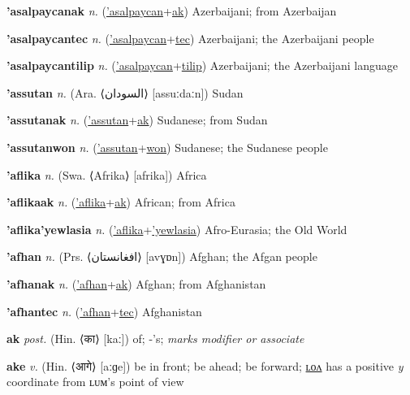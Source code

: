 \textbf{\hypertarget{'asalpaycanak}{'asalpaycanak}} \textit{n.} (\hyperlink{'asalpaycan}{'asalpaycan}+\allowbreak \hyperlink{ak}{ak})
Azerbaijani; from Azerbaijan

\textbf{\hypertarget{'asalpaycantec}{'asalpaycantec}} \textit{n.} (\hyperlink{'asalpaycan}{'asalpaycan}+\allowbreak \hyperlink{tec}{tec})
Azerbaijani; the Azerbaijani people

\textbf{\hypertarget{'asalpaycantilip}{'asalpaycantilip}} \textit{n.} (\hyperlink{'asalpaycan}{'asalpaycan}+\allowbreak \hyperlink{tilip}{tilip})
Azerbaijani; the Azerbaijani language

\textbf{\hypertarget{'assutan}{'assutan}} \textit{n.} (Ara. ⟨{\arabics{}السودان‎}⟩ [assuːdaːn])
Sudan

\textbf{\hypertarget{'assutanak}{'assutanak}} \textit{n.} (\hyperlink{'assutan}{'assutan}+\allowbreak \hyperlink{ak}{ak})
Sudanese; from Sudan

\textbf{\hypertarget{'assutanwon}{'assutanwon}} \textit{n.} (\hyperlink{'assutan}{'assutan}+\allowbreak \hyperlink{won}{won})
Sudanese; the Sudanese people

\textbf{\hypertarget{'aflika}{'aflika}} \textit{n.} (Swa. ⟨Afrika⟩ [afrika])
Africa

\textbf{\hypertarget{'aflikaak}{'aflikaak}} \textit{n.} (\hyperlink{'aflika}{'aflika}+\allowbreak \hyperlink{ak}{ak})
African; from Africa

\textbf{\hypertarget{'aflika'yewlasia}{'aflika'yewlasia}} \textit{n.} (\hyperlink{'aflika}{'aflika}+\allowbreak \hyperlink{'yewlasia}{'yewlasia})
Afro-Eurasia; the Old World

\textbf{\hypertarget{'afhan}{'afhan}} \textit{n.} (Prs. ⟨{\arabics{}افغانستان‬}⟩ [avɣɒn])
Afghan; the Afgan people

\textbf{\hypertarget{'afhanak}{'afhanak}} \textit{n.} (\hyperlink{'afhan}{'afhan}+\allowbreak \hyperlink{ak}{ak})
Afghan; from Afghanistan

\textbf{\hypertarget{'afhantec}{'afhantec}} \textit{n.} (\hyperlink{'afhan}{'afhan}+\allowbreak \hyperlink{tec}{tec})
Afghanistan

\textbf{\hypertarget{ak}{ak}} \textit{post.} (Hin. ⟨{\devanagari{}का}⟩ [kaː])
of; -’s; \textit{marks modifier or associate}

\textbf{\hypertarget{ake}{ake}} \textit{v.} (Hin. ⟨{\devanagari{}आगे}⟩ [aːɡe])
be in front; be ahead; be forward; \hyperlink{akelon}{ʟᴏᴧ} has a positive \textit{y} coordinate from ʟᴜᴍ’s point of view

